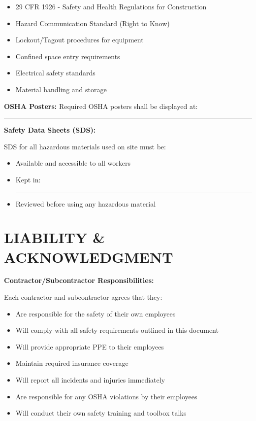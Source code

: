 \documentclass[11pt,letterpaper]{article}
\begin{document}
\begin{itemize}[leftmargin=0.5in]
\item 29 CFR 1926 - Safety and Health Regulations for Construction
\item Hazard Communication Standard (Right to Know)
\item Lockout/Tagout procedures for equipment
\item Confined space entry requirements
\item Electrical safety standards
\item Material handling and storage
\end{itemize}

\vspace{6pt}

\textbf{OSHA Posters:} Required OSHA posters shall be displayed at: \rule{5cm}{0.4pt}

\vspace{6pt}

\textbf{Safety Data Sheets (SDS):}

SDS for all hazardous materials used on site must be:
\begin{itemize}[leftmargin=0.75in]
\item Available and accessible to all workers
\item Kept in: \rule{8cm}{0.4pt}
\item Reviewed before using any hazardous material
\end{itemize}

\vspace{12pt}

\section*{LIABILITY \& ACKNOWLEDGMENT}

\textbf{Contractor/Subcontractor Responsibilities:}

Each contractor and subcontractor agrees that they:
\begin{itemize}[leftmargin=0.5in]
\item Are responsible for the safety of their own employees
\item Will comply with all safety requirements outlined in this document
\item Will provide appropriate PPE to their employees
\item Maintain required insurance coverage
\item Will report all incidents and injuries immediately
\item Are responsible for any OSHA violations by their employees
\item Will conduct their own safety training and toolbox talks
\end{itemize}
\end{document}
